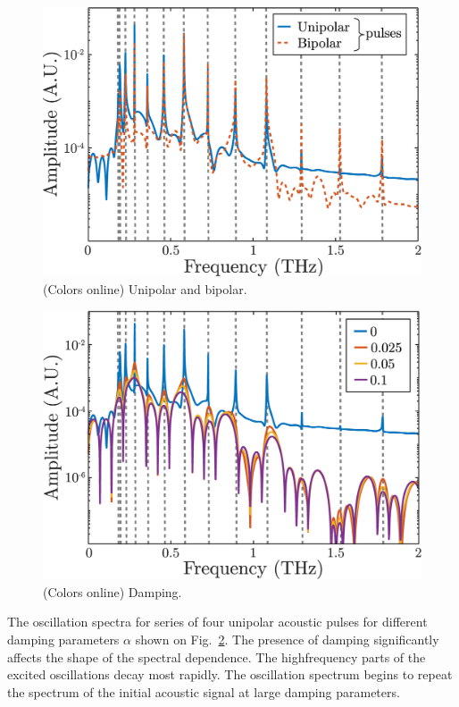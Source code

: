 \documentclass[%
superscriptaddress,
preprint,
showpacs,
amsmath,
amssymb,
aps,
prl,
]{revtex4-1}
\begin{document}
\begin{figure}[ht]
	\centering
	\includegraphics[width=0.95\columnwidth]{spectrumLogNorm-Ni_30nm-6_5T-uni_bip-3_57ps-withMode.eps}
	\caption{(Colors online) Unipolar and bipolar.}
	\label{fig:spectrumUniBip}
\end{figure}
	
\begin{figure}[ht]
	\centering
	\includegraphics[width=0.95\columnwidth]{spectrumDampingNormLog-Ni_30nm-6_5T-uni-3_57ps-withMode.eps}
	\caption{(Colors online) Damping.}
	\label{fig:spectrumUniDamping}
\end{figure}
	
The oscillation spectra for series of four unipolar acoustic pulses for different damping parameters $\alpha$ shown on Fig.~\ref{fig:spectrumUniDamping}. The presence of damping significantly affects the shape of the spectral dependence. The highfrequency parts of the excited oscillations decay most rapidly. The oscillation spectrum begins to repeat the spectrum of the initial acoustic signal at large damping parameters.
	
\end{document}
